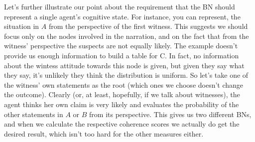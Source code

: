 \documentclass[
  10pt,
]{scrartcl}
\begin{document}
Let's further illustrate our point about the requirement that the BN should represent a single agent's cognitive state. For instance, you can represent, the situation in \(A\) from the perspective of the first witness. This suggests we should focus only on the nodes involved in the narration, and on the fact that from the witness' perspective the suspects are not equally likely. The example doesn't provide us enough information to build a table for \textsf{C}. In fact, no information about the wintess attitude towards this node is given, but given they say what they say, it's unlikely they think the distribution is uniform. So let's take one of the witness' own statements as the root (which ones we choose doesn't change the outcome). Clearly (or, at least, hopefully, if we talk about witnesses), the agent thinks her own claim is very likely and evaluates the probability of the other statements in \(A\) or \(B\) from its perspective. This gives us two different BNs, and when we calculate the respective coherence scores we actually do get the desired result, which isn't too hard for the other measures either.
\end{document}
